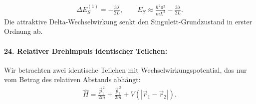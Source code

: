 \documentclass[11pt,a4paper]{scrartcl}
\newcommand{\abs}[1]{\left| #1 \right|}
\newcommand{\op}[1]{\hat{#1}}
\begin{document}
\begin{enumerate}[label=(\alph*)]
\begin{calculationbox}
\begin{calculationbox}[title=Singulett-Ortszustand]
                \begin{solutionbox}[title=Effekt im Singulett]
                    \begin{align*}
                        \Delta E_S^{(1)}=-\frac{3\lambda}{2L},
                        \qquad
                        E_S\approx \frac{\hbar^2\pi^2}{mL^2}-\frac{3\lambda}{2L}.
                    \end{align*}
                    Die attraktive Delta-Wechselwirkung senkt den Singulett-Grundzustand in erster Ordnung ab.
                \end{solutionbox}
            \end{calculationbox}
        \end{calculationbox}
    \end{enumerate}

    \paragraph{24. Relativer Drehimpuls identischer Teilchen:}

    Wir betrachten zwei identische Teilchen mit Wechselwirkungspotential, das nur vom Betrag des relativen Abstands abhängt:
    \begin{align*}
        \op H
        =
        \frac{\vec p_1^{\,2}}{2m}
        +
        \frac{\vec p_2^{\,2}}{2m}
        +
        V(\abs{\vec r_1-\vec r_2}).
    \end{align*}
\end{document}
